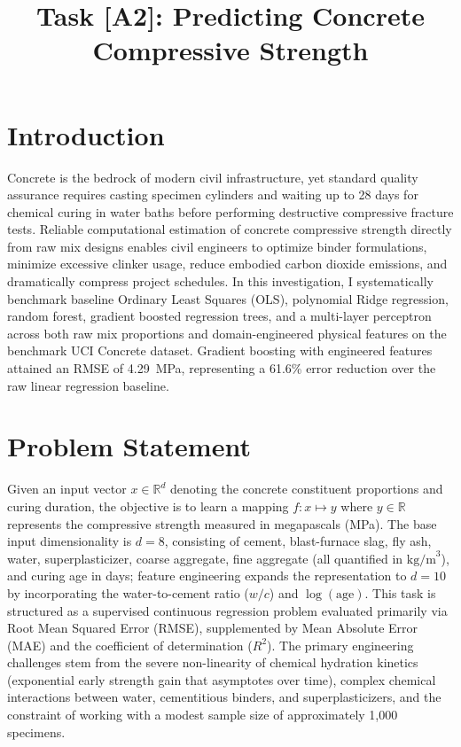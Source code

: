 \documentclass[conference,10pt,a4paper]{IEEEtran}
\begin{document}
\title{Task [A2]: Predicting Concrete Compressive Strength}
\author{
}
\maketitle

\section{Introduction}
Concrete is the bedrock of modern civil infrastructure, yet standard quality assurance requires casting specimen cylinders and waiting up to 28 days for chemical curing in water baths before performing destructive compressive fracture tests. Reliable computational estimation of concrete compressive strength directly from raw mix designs enables civil engineers to optimize binder formulations, minimize excessive clinker usage, reduce embodied carbon dioxide emissions, and dramatically compress project schedules. In this investigation, I systematically benchmark baseline Ordinary Least Squares (OLS), polynomial Ridge regression, random forest, gradient boosted regression trees, and a multi-layer perceptron across both raw mix proportions and domain-engineered physical features on the benchmark UCI Concrete dataset. Gradient boosting with engineered features attained an RMSE of 4.29~MPa, representing a 61.6\% error reduction over the raw linear regression baseline.

\section{Problem Statement}
Given an input vector $x \in \mathbb{R}^d$ denoting the concrete constituent proportions and curing duration, the objective is to learn a mapping $f: x \mapsto y$ where $y \in \mathbb{R}$ represents the compressive strength measured in megapascals (MPa). The base input dimensionality is $d=8$, consisting of cement, blast-furnace slag, fly ash, water, superplasticizer, coarse aggregate, fine aggregate (all quantified in $\text{kg/m}^3$), and curing age in days; feature engineering expands the representation to $d=10$ by incorporating the water-to-cement ratio ($w/c$) and $\log(\text{age})$. This task is structured as a supervised continuous regression problem evaluated primarily via Root Mean Squared Error (RMSE), supplemented by Mean Absolute Error (MAE) and the coefficient of determination ($R^2$). The primary engineering challenges stem from the severe non-linearity of chemical hydration kinetics (exponential early strength gain that asymptotes over time), complex chemical interactions between water, cementitious binders, and superplasticizers, and the constraint of working with a modest sample size of approximately 1,000 specimens.
\end{document}
